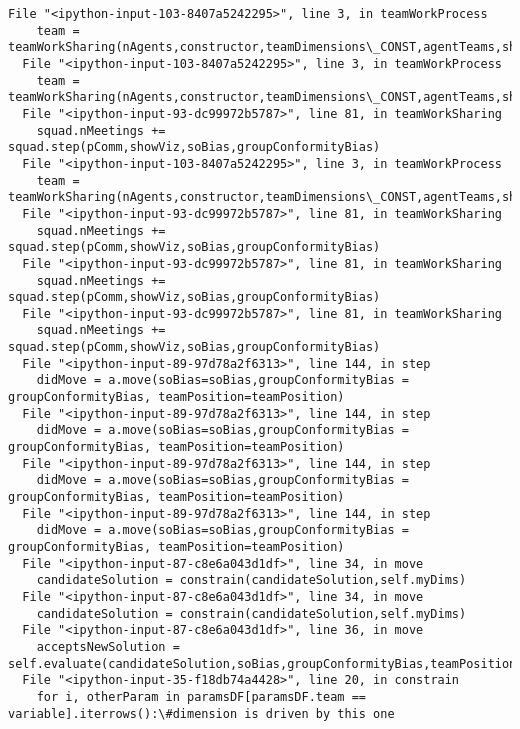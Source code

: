 \documentclass[11pt]{article}
\begin{document}
\begin{Verbatim}[commandchars=\\\{\}]
  File "<ipython-input-103-8407a5242295>", line 3, in teamWorkProcess
    team = teamWorkSharing(nAgents,constructor,teamDimensions\_CONST,agentTeams,showViz=showViz,speed=None,pComm=pComm,steps=steps,groupConformityBias=True,soBias=True,aiScore=aiScore,aiRange=aiRange)
  File "<ipython-input-103-8407a5242295>", line 3, in teamWorkProcess
    team = teamWorkSharing(nAgents,constructor,teamDimensions\_CONST,agentTeams,showViz=showViz,speed=None,pComm=pComm,steps=steps,groupConformityBias=True,soBias=True,aiScore=aiScore,aiRange=aiRange)
  File "<ipython-input-93-dc99972b5787>", line 81, in teamWorkSharing
    squad.nMeetings += squad.step(pComm,showViz,soBias,groupConformityBias)
  File "<ipython-input-103-8407a5242295>", line 3, in teamWorkProcess
    team = teamWorkSharing(nAgents,constructor,teamDimensions\_CONST,agentTeams,showViz=showViz,speed=None,pComm=pComm,steps=steps,groupConformityBias=True,soBias=True,aiScore=aiScore,aiRange=aiRange)
  File "<ipython-input-93-dc99972b5787>", line 81, in teamWorkSharing
    squad.nMeetings += squad.step(pComm,showViz,soBias,groupConformityBias)
  File "<ipython-input-93-dc99972b5787>", line 81, in teamWorkSharing
    squad.nMeetings += squad.step(pComm,showViz,soBias,groupConformityBias)
  File "<ipython-input-93-dc99972b5787>", line 81, in teamWorkSharing
    squad.nMeetings += squad.step(pComm,showViz,soBias,groupConformityBias)
  File "<ipython-input-89-97d78a2f6313>", line 144, in step
    didMove = a.move(soBias=soBias,groupConformityBias = groupConformityBias, teamPosition=teamPosition)
  File "<ipython-input-89-97d78a2f6313>", line 144, in step
    didMove = a.move(soBias=soBias,groupConformityBias = groupConformityBias, teamPosition=teamPosition)
  File "<ipython-input-89-97d78a2f6313>", line 144, in step
    didMove = a.move(soBias=soBias,groupConformityBias = groupConformityBias, teamPosition=teamPosition)
  File "<ipython-input-89-97d78a2f6313>", line 144, in step
    didMove = a.move(soBias=soBias,groupConformityBias = groupConformityBias, teamPosition=teamPosition)
  File "<ipython-input-87-c8e6a043d1df>", line 34, in move
    candidateSolution = constrain(candidateSolution,self.myDims)
  File "<ipython-input-87-c8e6a043d1df>", line 34, in move
    candidateSolution = constrain(candidateSolution,self.myDims)
  File "<ipython-input-87-c8e6a043d1df>", line 36, in move
    acceptsNewSolution = self.evaluate(candidateSolution,soBias,groupConformityBias,teamPosition=teamPosition)
  File "<ipython-input-35-f18db74a4428>", line 20, in constrain
    for i, otherParam in paramsDF[paramsDF.team == variable].iterrows():\#dimension is driven by this one

\end{Verbatim}
\end{document}
